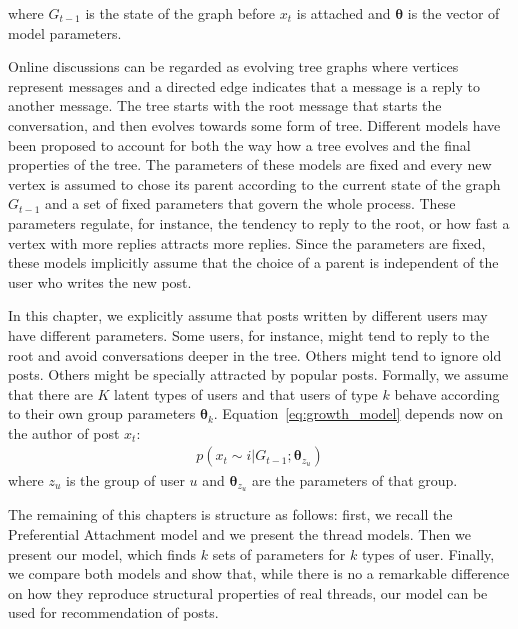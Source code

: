 \documentclass[smallextended]{svjour3}          %
\begin{document}
where $G_{t-1}$ is the state of the graph before $x_t$ is attached and $\boldsymbol{\theta}$ is the vector of model parameters.

Online discussions can be regarded as evolving tree graphs where vertices represent messages and a directed edge indicates that a message is a reply to another message. The tree starts with the root message that starts the conversation, and then evolves towards some form of tree. Different models have been proposed to account for both the way how a tree evolves and the final properties of the tree. The parameters of these models are fixed and every new vertex is assumed to chose its parent according to the current state of the graph $G_{t-1}$ and a set of fixed parameters that govern the whole process. These parameters regulate, for instance, the tendency to reply to the root, or how fast a vertex with more replies attracts more replies.  Since the parameters are fixed, these models implicitly assume that the choice of a parent is independent of the user who writes the new post.

In this chapter, we explicitly assume that posts written by different users may have different parameters. Some users, for instance, might tend to reply to the root and avoid conversations deeper in the tree. Others might tend to ignore old posts. Others might be specially attracted by popular posts. Formally, we assume that there are $K$ latent types of users and that users of type $k$ behave according to their own group parameters $\boldsymbol{\theta}_k$.  Equation~\ref{eq:growth_model} depends now on the author of post $x_t$:
\begin{align*}
p(x_t \sim i | G_{t-1}; \boldsymbol{\theta}_{z_u})
\end{align*}
where $z_u$ is the group of user $u$ and  $\boldsymbol{\theta}_{z_u}$ are the parameters of that group.

The remaining of this chapters is structure as follows: first, we recall the Preferential Attachment model and we present the thread models. Then we present our model, which finds $k$ sets of parameters for $k$ types of user. Finally, we compare both models and show that, while there is no a remarkable difference on how they reproduce structural properties of real threads, our model can be used for recommendation of posts. 
\end{document}
